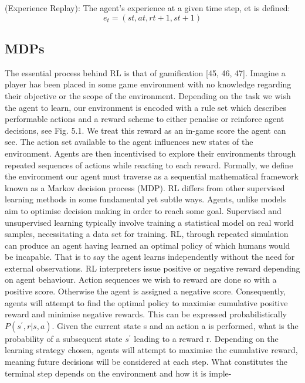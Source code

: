 \documentclass[runningheads]{llncs}
\begin{document}
\begin{theorem}
	(Experience Replay): The agent’s experience at a given time step, et is
	defined:
	\begin{equation}
	e_{t} = (st,at,rt+1,st+1)
	\end{equation}
\end{theorem}

\subsection{MDPs}
The essential process behind RL is that of gamification [45, 46, 47]. Imagine a player has
been placed in some game environment with no knowledge regarding their objective or
the scope of the environment. Depending on the task we wish the agent to learn, our
environment is encoded with a rule set which describes performable actions and a reward scheme to either penalise or reinforce agent decisions, see Fig. 5.1. We treat this reward as
an in-game score the agent can see. The action set available to the agent influences new
states of the environment. Agents are then incentivised to explore their environments
through repeated sequences of actions while reacting to each reward. Formally, we define
the environment our agent must traverse as a sequential mathematical framework known
as a Markov decision process (MDP). RL differs from other supervised learning methods in some fundamental yet subtle
ways. Agents, unlike models aim to optimise decision making in order to reach some goal.
Supervised and unsupervised learning typically involve training a statistical model on real
world samples, necessitating a data set for training. RL, through repeated simulation can
produce an agent having learned an optimal policy of which humans would be incapable.
That is to say the agent learns independently without the need for external observations.
RL interpreters issue positive or negative reward depending on agent behaviour.
Action sequences we wish to reward are done so with a positive score. Otherwise the
agent is assigned a negative score. Consequently, agents will attempt to find the optimal
policy to maximise cumulative positive reward and minimise negative rewards. This
can be expressed probabilistically $P(s^{\prime},r|s,a)$. Given the current state s and an action a is performed, what is the probability of a subsequent state $s^{\prime}$ leading to a reward r.
Depending on the learning strategy chosen, agents will attempt to maximise the cumulative
reward, meaning future decisions will be considered at each step. What constitutes the terminal step depends on the environment and how it is imple-
\end{document}
